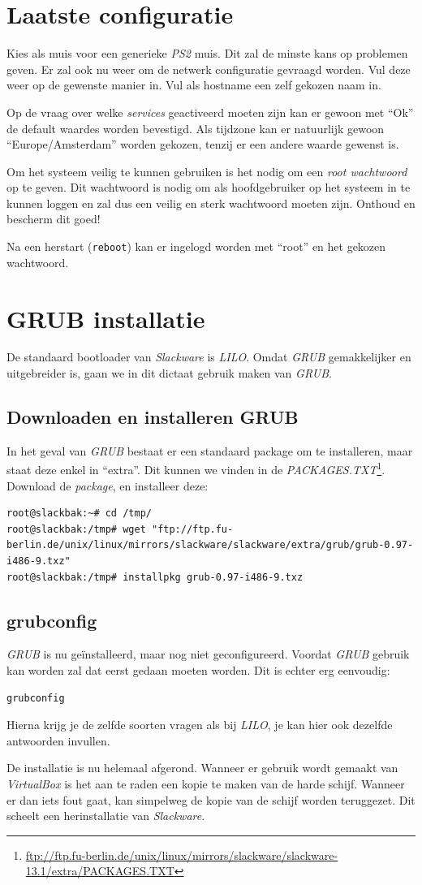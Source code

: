 \section{Laatste configuratie}
Kies als muis voor een generieke \emph{PS2} muis. Dit zal de minste kans op problemen geven. 
Er zal ook nu weer om de netwerk configuratie gevraagd worden. Vul deze weer op de gewenste manier in. Vul als hostname een zelf gekozen naam in.

Op de vraag over welke \emph{services} geactiveerd moeten zijn kan er gewoon met ``Ok'' de default waardes worden bevestigd. Als tijdzone kan er natuurlijk gewoon ``Europe/Amsterdam'' worden gekozen, tenzij er een andere waarde gewenst is. 

Om het systeem veilig te kunnen gebruiken is het nodig om een \emph{root wachtwoord} op te geven. Dit wachtwoord is nodig om als hoofdgebruiker op het systeem in te kunnen loggen en zal dus een veilig en sterk wachtwoord moeten zijn. Onthoud en bescherm dit goed! 

Na een herstart (\texttt{reboot}) kan er ingelogd worden met ``root'' en het gekozen wachtwoord. 

\section{GRUB installatie}
De standaard bootloader van \emph{Slackware} is \emph{LILO}. Omdat \emph{GRUB} gemakkelijker en uitgebreider is, gaan we in dit dictaat gebruik maken van \emph{GRUB}.

\subsection{Downloaden en installeren GRUB}
In het geval van \emph{GRUB} bestaat er een standaard package om te installeren, maar staat deze enkel in ``extra''. Dit kunnen we vinden in de \emph{PACKAGES.TXT}\footnote{\url{ftp://ftp.fu-berlin.de/unix/linux/mirrors/slackware/slackware-13.1/extra/PACKAGES.TXT}}. Download de \emph{package}, en installeer deze: 
\begin{lstlisting}
root@slackbak:~# cd /tmp/
root@slackbak:/tmp# wget "ftp://ftp.fu-berlin.de/unix/linux/mirrors/slackware/slackware/extra/grub/grub-0.97-i486-9.txz"
root@slackbak:/tmp# installpkg grub-0.97-i486-9.txz 
\end{lstlisting}

\subsection{grubconfig}
\emph{GRUB} is nu ge\"{i}nstalleerd, maar nog niet geconfigureerd. Voordat \emph{GRUB} gebruik kan worden zal dat eerst gedaan moeten worden. Dit is echter erg eenvoudig:
\begin{lstlisting}
grubconfig
\end{lstlisting}
Hierna krijg je de zelfde soorten vragen als bij \emph{LILO}, je kan hier ook dezelfde antwoorden invullen.

De installatie is nu helemaal afgerond. Wanneer er gebruik wordt gemaakt van \emph{VirtualBox} is het aan te raden een kopie te maken van de harde schijf. Wanneer er dan iets fout gaat, kan simpelweg de kopie van de schijf worden teruggezet. Dit scheelt een herinstallatie van \emph{Slackware}. 
